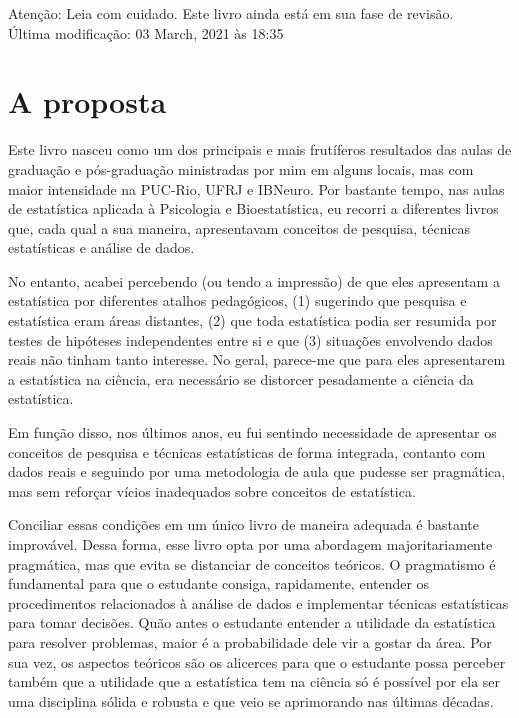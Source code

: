 \documentclass[
]{book}
\begin{document}
Atenção: Leia com cuidado. Este livro ainda está em sua fase de revisão.\\
Última modificação: 03 March, 2021 às 18:35

\hypertarget{a-proposta}{%
\section{A proposta}\label{a-proposta}}

Este livro nasceu como um dos principais e mais frutíferos resultados das aulas de graduação e pós-graduação ministradas por mim em alguns locais, mas com maior intensidade na PUC-Rio, UFRJ e IBNeuro. Por bastante tempo, nas aulas de estatística aplicada à Psicologia e Bioestatística, eu recorri a diferentes livros que, cada qual a sua maneira, apresentavam conceitos de pesquisa, técnicas estatísticas e análise de dados.

No entanto, acabei percebendo (ou tendo a impressão) de que eles apresentam a estatística por diferentes atalhos pedagógicos, (1) sugerindo que pesquisa e estatística eram áreas distantes, (2) que toda estatística podia ser resumida por testes de hipóteses independentes entre si e que (3) situações envolvendo dados reais não tinham tanto interesse. No geral, parece-me que para eles apresentarem a estatística na ciência, era necessário se distorcer pesadamente a ciência da estatística.

Em função disso, nos últimos anos, eu fui sentindo necessidade de apresentar os conceitos de pesquisa e técnicas estatísticas de forma integrada, contanto com dados reais e seguindo por uma metodologia de aula que pudesse ser pragmática, mas sem reforçar vícios inadequados sobre conceitos de estatística.

Conciliar essas condições em um único livro de maneira adequada é bastante improvável. Dessa forma, esse livro opta por uma abordagem majoritariamente pragmática, mas que evita se distanciar de conceitos teóricos. O pragmatismo é fundamental para que o estudante consiga, rapidamente, entender os procedimentos relacionados à análise de dados e implementar técnicas estatísticas para tomar decisões. Quão antes o estudante entender a utilidade da estatística para resolver problemas, maior é a probabilidade dele vir a gostar da área. Por sua vez, os aspectos teóricos são os alicerces para que o estudante possa perceber também que a utilidade que a estatística tem na ciência só é possível por ela ser uma disciplina sólida e robusta e que veio se aprimorando nas últimas décadas.
\end{document}
